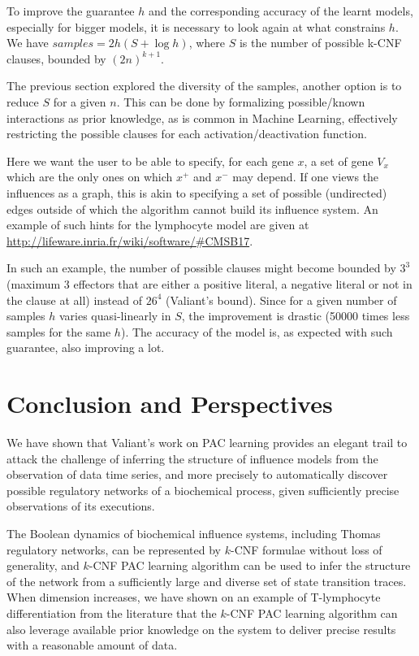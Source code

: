 \documentclass{llncs}
\begin{document}
To improve the guarantee $h$ and the corresponding accuracy of the learnt
models, especially for bigger models, it is necessary to look again at what
constrains $h$. We have \(samples = 2h(S + \log h)\), where $S$ is the number
of possible k-CNF clauses, bounded by $(2n)^{k+1}$.

The previous section explored the diversity of the samples, another option is
to reduce $S$ for a given $n$. This can be done by formalizing possible/known
interactions as prior knowledge, as is common in Machine Learning, effectively
restricting the possible clauses for each activation/deactivation function.

Here we want the user to be able to specify, for each gene $x$, a set of gene
$V_x$ which are the only ones on which $x^+$ and $x^-$ may depend. If one
views the influences as a graph, this is akin to specifying a set of possible
(undirected) edges outside of which the algorithm cannot build its influence
system. An example of such hints for the lymphocyte model are given at
\url{http://lifeware.inria.fr/wiki/software/\#CMSB17}.

In such an example, the number of possible clauses might become bounded by
$3^3$ (maximum 3 effectors that are either a positive literal, a negative
literal or not in the clause at all) instead of $26^4$ (Valiant's bound).
Since for a given number of samples $h$ varies quasi-linearly in $S$, the
improvement is drastic (50000 times less samples for the same $h$). The
accuracy of the model is, as expected with such guarantee, also improving a
lot.

\section{Conclusion and Perspectives}

We have shown that Valiant's work on PAC learning provides an elegant trail 
to attack the challenge of inferring the structure of influence models from the observation of data time series,
and more precisely to automatically discover possible regulatory networks of a biochemical process, given sufficiently precise observations of its executions.

The Boolean dynamics of biochemical influence systems, including Thomas regulatory networks, can be represented by $k$-CNF formulae without loss of generality,
and $k$-CNF PAC learning algorithm can be used to infer the structure of the network from
a sufficiently large and diverse set of state transition traces.
When dimension increases, we have shown on an example of T-lymphocyte differentiation from the literature
that the $k$-CNF PAC learning algorithm can also leverage available
prior knowledge on the system to deliver precise results with a reasonable
amount of data.
\end{document}
